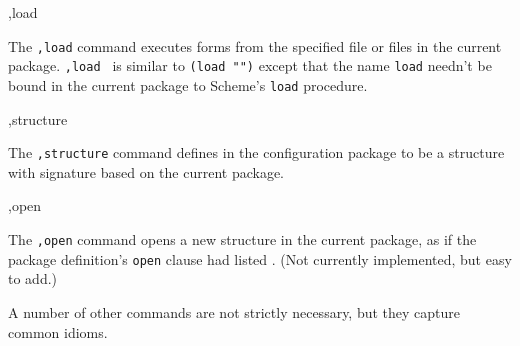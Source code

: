 \begin{list}{}{}{}
\item
\begin{code}
,load  \etc
\end{code}
    The {\tt,load} command executes forms from the specified file or
    files in the current package.  {\tt,load } is similar
    to {\tt(load "")}
    except that the name {\tt load} needn't be bound in the current
    package to Scheme's {\tt load} procedure.

\item
\begin{code}
,structure  
\end{code}
    The {\tt,structure} command defines  in the
    configuration package to be a structure with signature
     based on the current package.

\item
\begin{code}
,open 
\end{code}
    The {\tt,open} command opens a new structure in the current
    package, as if the package definition's {\tt open} clause
    had listed .  (Not currently implemented, but
    easy to add.)
\end{list}


A number of other commands are not strictly necessary, but they
capture common idioms.


